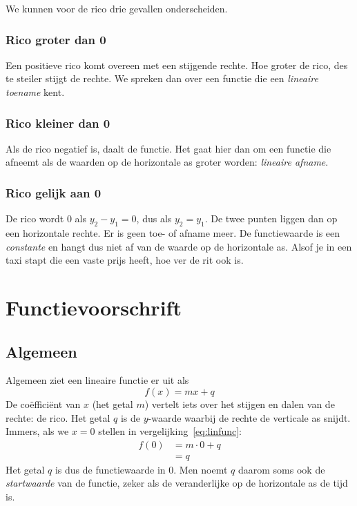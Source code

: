 We kunnen voor de rico drie gevallen onderscheiden.

\subsubsection{Rico groter dan 0}
Een positieve rico komt overeen met een stijgende rechte. Hoe groter de rico, des te steiler stijgt de rechte. We spreken dan over een functie die een \emph{lineaire toename} kent.

\subsubsection{Rico kleiner dan 0}
Als de rico negatief is, daalt de functie. Het gaat hier dan om een functie die afneemt als de waarden op de horizontale as groter worden: \emph{lineaire afname}. 

\subsubsection{Rico gelijk aan 0}
De rico wordt 0 als $y_2-y_1=0$, dus als $y_2=y_1$. De twee punten liggen dan op een horizontale rechte. Er is geen toe- of afname meer. De functiewaarde is een \emph{constante} en hangt dus niet af van de waarde op de horizontale as. Alsof je in een taxi stapt die een vaste prijs heeft, hoe ver de rit ook is.

\section{Functievoorschrift}
\label{sec:functievoorschrift}
\subsection{Algemeen}
Algemeen ziet een lineaire functie er uit als
\begin{equation}\label{eq:linfunc}
f(x)=mx+q
\end{equation}
De coëfficiënt van $x$ (het getal $m$) vertelt iets over het stijgen en dalen van de rechte: de rico. Het getal $q$ is de $y$-waarde waarbij de rechte de verticale as snijdt. Immers, als we $x=0$ stellen in vergelijking~\eqref{eq:linfunc}:
\begin{align*}
f(0)&=m\cdot 0 + q\\
&= q
\end{align*}
Het getal $q$ is dus de functiewaarde in 0. Men noemt $q$ daarom soms ook de \emph{startwaarde} van de functie, zeker als de veranderlijke op de horizontale as de tijd is.

